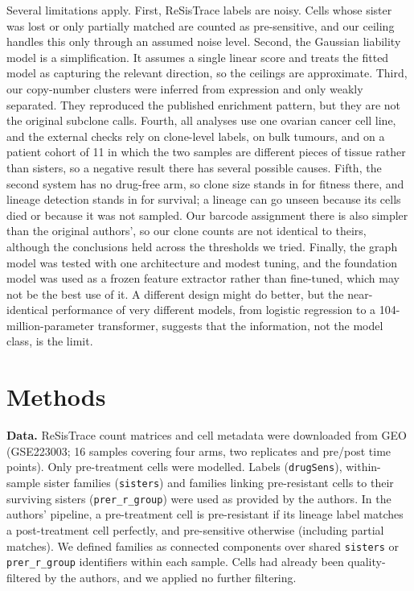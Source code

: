 \documentclass[11pt,a4paper]{article}
\begin{document}
Several limitations apply. First, ReSisTrace labels are noisy. Cells whose sister was lost or only partially matched are counted as pre-sensitive, and our ceiling handles this only through an assumed noise level. Second, the Gaussian liability model is a simplification. It assumes a single linear score and treats the fitted model as capturing the relevant direction, so the ceilings are approximate. Third, our copy-number clusters were inferred from expression and only weakly separated. They reproduced the published enrichment pattern, but they are not the original subclone calls. Fourth, all analyses use one ovarian cancer cell line, and the external checks rely on clone-level labels, on bulk tumours, and on a patient cohort of 11 in which the two samples are different pieces of tissue rather than sisters, so a negative result there has several possible causes. Fifth, the second system has no drug-free arm, so clone size stands in for fitness there, and lineage detection stands in for survival; a lineage can go unseen because its cells died or because it was not sampled. Our barcode assignment there is also simpler than the original authors', so our clone counts are not identical to theirs, although the conclusions held across the thresholds we tried. Finally, the graph model was tested with one architecture and modest tuning, and the foundation model was used as a frozen feature extractor rather than fine-tuned, which may not be the best use of it. A different design might do better, but the near-identical performance of very different models, from logistic regression to a 104-million-parameter transformer, suggests that the information, not the model class, is the limit.

\section*{Methods}

\textbf{Data.} ReSisTrace count matrices and cell metadata were downloaded from GEO (GSE223003; 16 samples covering four arms, two replicates and pre/post time points). Only pre-treatment cells were modelled. Labels (\texttt{drugSens}), within-sample sister families (\texttt{sisters}) and families linking pre-resistant cells to their surviving sisters (\texttt{prer\_r\_group}) were used as provided by the authors. In the authors' pipeline, a pre-treatment cell is pre-resistant if its lineage label matches a post-treatment cell perfectly, and pre-sensitive otherwise (including partial matches). We defined families as connected components over shared \texttt{sisters} or \texttt{prer\_r\_group} identifiers within each sample. Cells had already been quality-filtered by the authors, and we applied no further filtering.
\end{document}
